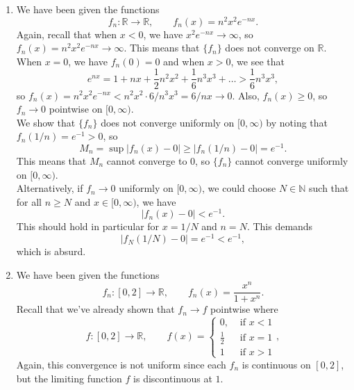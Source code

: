 \documentclass[10pt]{article}
\def\R{\mathbb{R}}
\def\N{\mathbb{N}}
\begin{document}
\begin{enumerate}
        We show that $f_n \to 0$ uniformly on $[0, \infty)$. Note that $f_n(0) = 0$
        and when $x > 0$, we have \[
            e^{nx} = 1 + nx + \frac{1}{2}n^2x^2 + \dots > \frac{1}{2}n^2x^2,
        \] so $e^{-nx} < 2 / n^2x^2$. Thus, $f_n(x) = x^2e^{-nx} < 2 / n^2$, so \[
            M_n = \sup|f_n(x) - 0| = \sup x^2e^{-nx} \leq \frac{2}{n^2} \to 0.
        \] This means that $M_n \to 0$, so $f_n \to 0$ uniformly on $[0, \infty)$.\\

        Formally, given $\epsilon > 0$, choose $N \in \N$ such that $N^2\epsilon >
        2$. Thus, for all $n \geq N$ and $x \in [0, \infty)$, we have \[
            |f_n(x) - 0| = x^2e^{-nx} < \frac{2}{n^2} \leq \frac{2}{N^2} < \epsilon.
        \] This shows that $f_n \to 0$ uniformly on $[0, \infty)$.
        

        \item We have been given the functions \[
            f_n\colon \R \to \R, \qquad f_n(x) = n^2x^2e^{-nx}.
        \] Again, recall that when $x < 0$, we have $x^2e^{-nx} \to \infty$, so
        $f_n(x) = n^2x^2e^{-nx} \to \infty$. This means that $\{f_n\}$ does not
        converge on $\R$. When $x = 0$, we have $f_n(0) = 0$ and when $x > 0$, we
        see that \[
            e^{nx} = 1 + nx + \frac{1}{2}n^2x^2 + \frac{1}{6}n^3x^3 + \dots >
            \frac{1}{6}n^3x^3,
        \] so $f_n(x) = n^2x^2 e^{-nx} < n^2x^2 \cdot 6 / n^3x^3 = 6 / nx \to 0$.
        Also, $f_n(x) \geq 0$, so $f_n \to 0$ pointwise on $[0, \infty)$. \\

        We show that $\{f_n\}$ does not converge uniformly on $[0, \infty)$ by
        noting that $f_n(1 / n) = e^{-1} > 0$, so \[
            M_n = \sup|f_n(x) - 0| \geq |f_n(1 /n) - 0| = e^{-1}.
        \] This means that $M_n$ cannot converge to $0$, so $\{f_n\}$ cannot
        converge uniformly on $[0, \infty)$. \\

        Alternatively, if $f_n \to 0$ uniformly on $[0, \infty)$, we could choose $N
        \in \N$ such that for all $n \geq N$ and $x \in [0, \infty)$, we have \[
            |f_n(x) - 0| < e^{-1}.
        \] This should hold in particular for $x = 1 / N$ and $n = N$. This demands
        \[
            |f_N(1 / N) - 0| = e^{-1} < e^{-1},
        \] which is absurd.


        \item We have been given the functions \[
            f_n\colon [0, 2] \to \R, \qquad f_n(x) = \frac{x^n}{1 + x^n}.
        \] Recall that we've already shown that $f_n \to f$ pointwise where \[
            f\colon [0, 2] \to \R, \qquad f(x) = \begin{cases}
                0, &\text{ if } x < 1 \\
                \frac{1}{2} &\text{ if } x = 1 \\
                1 &\text{ if } x > 1
            \end{cases},
        \] Again, this convergence is not uniform since each $f_n$ is continuous on
        $[0, 2]$, but the limiting function $f$ is discontinuous at $1$.



\end{enumerate}
\end{document}
